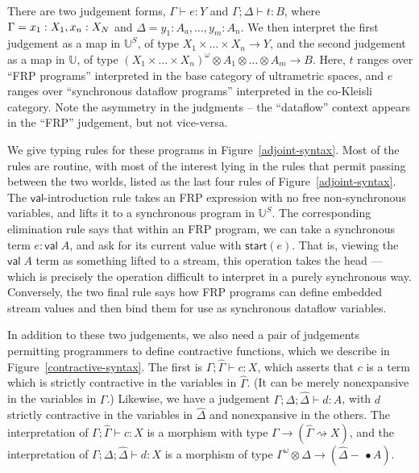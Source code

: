 \documentclass[nocopyrightspace,preprint]{sigplanconf}
\newcommand{\ultrametric}{\mathbb{U}}
\newcommand{\shrink}{\rightsquigarrow}
\newcommand{\Start}[1]{\mathsf{start}(#1)}
\newcommand{\lollishrink}{-\!\!\!\,\bullet}
\newcommand{\valtype}[1]{\mathsf{val}\;{#1}}
\newcommand{\judgeu}[3]{{#1} \vdash {#2} : {#3}}
\newcommand{\judgek}[4][\Gamma]{{#1};{#2} \vdash {#3} : {#4}}
\newcommand{\judgec}[4][\Gamma]{{#1};{#2} \vdash {#3} : {#4}}
\newcommand{\judgekc}[4][\Delta]{\Gamma;{#1};{#2} \vdash {#3} : {#4}}
\begin{document}
There are two judgement forms, $\judgeu{\Gamma}{e}{Y}$ and
$\judgek{\Delta}{t}{B}$, where $\Gamma = x_1:X_1,\label,x_n:X_N$ and
$\Delta = y_1:A_a, \ldots, y_m:A_n$.  We then interpret the first
judgement as a map in $\ultrametric^S$, of type $X_1 \times \ldots
\times X_n \to Y$, and the second judgement as a map in
$\ultrametric$, of type $(X_1 \times \ldots \times X_n)^\omega
\otimes A_1 \otimes \ldots \otimes A_m \to B$. Here, $t$ ranges over
``FRP programs'' interpreted in the base category of ultrametric
spaces, and $e$ ranges over ``synchronous dataflow programs''
interpreted in the co-Kleisli category. Note the asymmetry in 
the judgments -- the ``dataflow'' context appears in the ``FRP''
judgement, but not vice-versa. 

We give typing rules for these programs in
Figure~\ref{adjoint-syntax}.  Most of the rules are routine, with most
of the interest lying in the rules that permit passing between the two
worlds, listed as the last four rules of
Figure~\ref{adjoint-syntax}. The $\mathsf{val}$-introduction rule
takes an FRP expression with no free non-synchronous variables, and
lifts it to a synchronous program in $\ultrametric^S$. The
corresponding elimination rule says that within an FRP program, we can
take a synchronous term $e : \valtype{A}$, and ask for its current
value with $\Start{e}$. That is, viewing the $\valtype{A}$ term as
something lifted to a stream, this operation takes the head --- which
is precisely the operation difficult to interpret in a purely
synchronous way.  Conversely, the two final rule says how FRP programs
can define embedded stream values and then bind them for use as
synchronous dataflow variables.

In addition to these two judgements, we also need a pair of judgements
permitting programmers to define contractive functions, which we
describe in Figure~\ref{contractive-syntax}. The first is
$\judgec{\hat{\Gamma}}{c}{X}$, which asserts that $c$ is a term which
is strictly contractive in the variables in $\hat{\Gamma}$.  (It can
be merely nonexpansive in the variables in $\Gamma$.) Likewise, we
have a judgement $\judgekc{\hat{\Delta}}{d}{A}$, with $d$ 
strictly contractive in the variables in $\hat{\Delta}$ and
nonexpansive in the others. The interpretation of
$\judgec{\hat{\Gamma}}{c}{X}$ is a morphism with type $\Gamma \to
(\hat{\Gamma} \shrink X)$, and the interpretation of
$\judgekc{\hat{\Delta}}{d}{X}$ is a morphism of type $\Gamma^\omega
\otimes \Delta \to (\hat{\Delta} \lollishrink A)$.  
\end{document}
